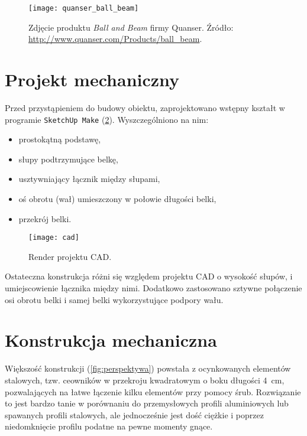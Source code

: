 \begin{figure}[H]
	\centering
	\texttt{[image: quanser\_ball\_beam]}
	\caption{Zdjęcie produktu \textit{Ball and Beam} firmy Quanser. Źródło: \url{http://www.quanser.com/Products/ball_beam}.}
	\label{fig:quanser_ball_beam}
\end{figure}

\section{Projekt mechaniczny}

Przed przystąpieniem do budowy obiektu, zaprojektowano wstępny kształt w programie  \texttt{SketchUp Make} (\cref{fig:cad_render}). Wyszczególniono na nim:

\begin{itemize}
	\item prostokątną podstawę,
	\item słupy podtrzymujące belkę,
	\item usztywniający łącznik między słupami,
	\item oś obrotu (wał) umieszczony w połowie długości belki,
	\item przekrój belki.
\end{itemize}

\begin{figure}[H]
	\centering
	\texttt{[image: cad]}
	\caption{Render projektu CAD.}
	\label{fig:cad_render}
\end{figure}

Ostateczna konstrukcja różni się względem projektu \textsc{CAD} o wysokość słupów, i umiejscowienie łącznika między nimi. Dodatkowo zastosowano sztywne połączenie osi obrotu belki i samej belki wykorzystujące podpory wału.

\section{Konstrukcja mechaniczna}
\label{sec:ch2_konstrukcja_mechaniczna}

Większość konstrukcji (\cref{fig:perspektywa}) powstała z ocynkowanych elementów stalowych, tzw. ceowników w przekroju kwadratowym o boku długości \SI{4}{cm}, pozwalających na łatwe łączenie kilku elementów przy pomocy śrub. Rozwiązanie to jest bardzo tanie w porównaniu do przemysłowych profili aluminiowych lub spawanych profili stalowych, ale jednocześnie jest dość ciężkie i poprzez niedomknięcie profilu podatne na pewne momenty gnące.

